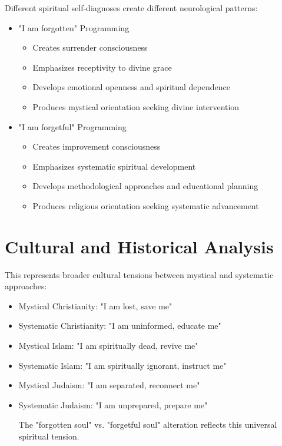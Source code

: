 \documentclass[11pt,twoside]{book}
\begin{document}
Different spiritual self-diagnoses create different neurological patterns:
\begin{itemize}
\item "I am forgotten" Programming
\label{sec:org66c3634}
\begin{itemize}
\item Creates surrender consciousness
\item Emphasizes receptivity to divine grace
\item Develops emotional openness and spiritual dependence
\item Produces mystical orientation seeking divine intervention
\end{itemize}
\item "I am forgetful" Programming
\label{sec:org80df592}
\begin{itemize}
\item Creates improvement consciousness
\item Emphasizes systematic spiritual development
\item Develops methodological approaches and educational planning
\item Produces religious orientation seeking systematic advancement
\end{itemize}
\end{itemize}
\section*{Cultural and Historical Analysis}
\label{sec:org5fba1c0}

This represents broader cultural tensions between mystical and systematic approaches:
\begin{itemize}
\item Mystical Christianity: "I am lost, save me"
\label{sec:orgf877b74}
\item Systematic Christianity: "I am uninformed, educate me"
\label{sec:org9726979}

\item Mystical Islam: "I am spiritually dead, revive me"
\label{sec:org2c5078d}
\item Systematic Islam: "I am spiritually ignorant, instruct me"
\label{sec:orgf6eb2a7}

\item Mystical Judaism: "I am separated, reconnect me"
\label{sec:org44740ba}
\item Systematic Judaism: "I am unprepared, prepare me"
\label{sec:org32b30db}

The "forgotten soul" vs. "forgetful soul" alteration reflects this universal spiritual tension.
\end{itemize}
\end{document}
